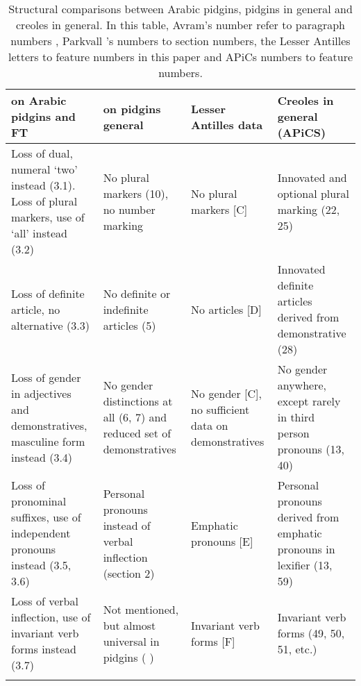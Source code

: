 \documentclass[output=paper,colorlinks,citecolor=brown]{langscibook}
\begin{document}
\begin{sidewaystable} %
\caption{Structural comparisons between Arabic pidgins, pidgins in general and creoles in general. In this table, Avram’s number refer to paragraph numbers \citep{Avram2017}, Parkvall ’s  numbers  to section numbers, the Lesser Antilles letters to feature numbers in this paper and APiCs numbers to feature numbers.}
\label{tab:1 bakker:1a} 
\scriptsize
\begin{tabularx}{\textwidth}{QQp{2.5cm}Q}
\lsptoprule
{\citet{Avram2017} on Arabic pidgins and FT} &
{\citet{Parkvall2017} on pidgins general} &
{Lesser Antilles data} &
{Creoles in general (APiCS)}\\
\midrule
Loss of dual, numeral `two'  instead (3.1). Loss of plural markers, use of `all'  instead (3.2) &
No plural markers (10), no number marking &
No plural markers [C] &
Innovated and optional plural marking (22, 25)\\
\midrule
Loss of definite article, no alternative (3.3) &
No definite or indefinite articles (5) &
No articles [D] &
Innovated definite articles derived from demonstrative (28)\\
\midrule
Loss of gender in adjectives and demonstratives, masculine form instead (3.4)  &
No gender distinctions at all (6, 7) and reduced set of demonstratives &
No gender [C], no sufficient data on demonstratives &
No gender anywhere, except rarely in third person pronouns (13, 40)\\
\midrule
Loss of pronominal suffixes, use of independent pronouns instead (3.5, 3.6) &
Personal pronouns instead of verbal inflection (section 2) &
Emphatic pronouns [E] &
Personal pronouns derived from emphatic pronouns in lexifier (13, 59)\\
\midrule
Loss of verbal inflection, use of invariant verb forms instead (3.7) &
Not mentioned, but almost universal in pidgins ( \citealt{ParkvallBakker2013}) &
Invariant verb forms [F] &
Invariant verb forms (49, 50, 51, etc.) \\
\lspbottomrule
\end{tabularx}
\end{sidewaystable}
\end{document}
